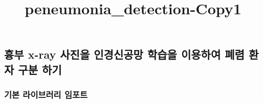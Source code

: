 \documentclass[11pt]{article}
\title{peneumonia\_detection-Copy1}
\begin{document}
    
    
    \maketitle
    
    

    
    \hypertarget{uxd749uxbd80-x-ray-uxc0acuxc9c4uxc744-uxc778uxacbduxc2e0uxacf5uxb9dd-uxd559uxc2b5uxc744-uxc774uxc6a9uxd558uxc5ec-uxd3d0uxb834-uxd658uxc790-uxad6cuxbd84-uxd558uxae30}{%
\subsection{흉부 x-ray 사진을 인경신공망 학습을 이용하여 폐렴 환자 구분
하기}\label{uxd749uxbd80-x-ray-uxc0acuxc9c4uxc744-uxc778uxacbduxc2e0uxacf5uxb9dd-uxd559uxc2b5uxc744-uxc774uxc6a9uxd558uxc5ec-uxd3d0uxb834-uxd658uxc790-uxad6cuxbd84-uxd558uxae30}}

    \hypertarget{uxae30uxbcf8-uxb77cuxc774uxbe0cuxb7ecuxb9ac-uxc784uxd3ecuxd2b8}{%
\subsubsection{기본 라이브러리
임포트}\label{uxae30uxbcf8-uxb77cuxc774uxbe0cuxb7ecuxb9ac-uxc784uxd3ecuxd2b8}}
\end{document}
